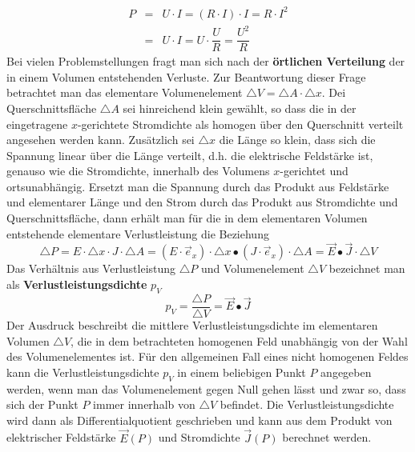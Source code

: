 \begin{equation}
\boxed{
\begin{array}{lll}
P&=&U\cdot I=\left(R\cdot I\right)\cdot I=R\cdot I^2\\
&=&U\cdot I=U\cdot \dfrac{U}{R}=\dfrac{U^2}{R}
\end{array}}
\end{equation}
Bei vielen Problemstellungen fragt man sich nach der \textbf{örtlichen Verteilung} der in einem Volumen entstehenden Verluste. Zur Beantwortung dieser Frage betrachtet man das elementare Volumenelement $\triangle V=\triangle A\cdot \triangle x$. Dei Querschnittsfläche $\triangle A$ sei hinreichend klein gewählt, so dass die in der eingetragene $x$-gerichtete Stromdichte als homogen über den Querschnitt verteilt angesehen werden kann. Zusätzlich sei $\triangle x$ die Länge so klein, dass sich die Spannung linear über die Länge verteilt, d.h. die elektrische Feldstärke ist, genauso wie die Stromdichte, innerhalb des Volumens $x$-gerichtet und ortsunabhängig. 
\newline\newline
Ersetzt man die Spannung durch das Produkt aus Feldstärke und elementarer Länge und den Strom durch das Produkt aus Stromdichte und Querschnittsfläche, dann erhält man für die in dem elementaren Volumen entstehende elementare Verlustleistung die Beziehung
\begin{equation} 
\boxed{\triangle P=E\cdot \triangle x\cdot J\cdot \triangle A=\left(E\cdot \overrightarrow{e}_x\right)\cdot \triangle x\bullet \left(J\cdot \overrightarrow{e}_x\right)\cdot \triangle A=\overrightarrow{E}\bullet \overrightarrow{J}\cdot \triangle V}
\end{equation} 
Das Verhältnis aus Verlustleistung $\triangle P$ und Volumenelement $\triangle V$ bezeichnet man als \textbf{Verlustleistungsdichte} $p_V$
\begin{equation}
\boxed{p_V=\dfrac{\triangle P}{\triangle V}=\overrightarrow{E}\bullet \overrightarrow{J}}
\end{equation}
Der Ausdruck beschreibt die mittlere Verlustleistungsdichte im elementaren Volumen $\triangle V$, die in dem betrachteten homogenen Feld unabhängig von der Wahl des Volumenelementes ist. Für den allgemeinen Fall eines nicht homogenen Feldes kann die Verlustleistungsdichte $p_V$ in einem beliebigen Punkt $P$ angegeben werden, wenn man das Volumenelement gegen Null gehen lässt und zwar so, dass sich der Punkt $P$ immer innerhalb von $\triangle V$ befindet. Die Verlustleistungsdichte wird dann als Differentialquotient geschrieben und kann aus dem Produkt von elektrischer Feldstärke $\overrightarrow{E}\left(P\right)$ und Stromdichte $\overrightarrow{J}\left(P\right)$ berechnet werden.
